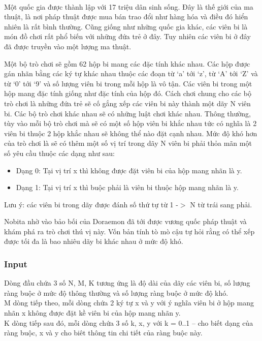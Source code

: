 

 

Một quốc gia được thành lập với 17 triệu dân sinh sống. Đây là thế giới của ma thuật, là nơi pháp thuật được mua bán trao đổi như hàng hóa và điều đó hiển nhiên là rất bình thường. Cũng giống như những quốc gia khác, các viên bi là món đồ chơi rất phổ biến với những đứa trẻ ở đây. Tuy nhiên các viên bi ở đây đã được truyền vào một lượng ma thuật.

Một bộ trò chơi sẽ gồm 62 hộp bi mang các đặc tính khác nhau. Các hộp được gán nhãn bằng các ký tự khác nhau thuộc các đoạn từ ‘a’ tới ‘z’, từ ‘A’ tới ‘Z’ và từ ‘0’ tới ‘9’ và số lượng viên bi trong mỗi hộp là vô tận. Các viên bi trong một hộp mang đặc tính giống như đặc tính của hộp đó. Cách chơi chung cho các bộ trò chơi là những đứa trẻ sẽ cố gắng xếp các viên bi này thành một dãy N viên bi. Các bộ trò chơi khác nhau sẽ có những luật chơi khác nhau. Thông thường, tùy vào mỗi bộ trò chơi mà sẽ có một số hộp viên bi khắc nhau tức có nghĩa là 2 viên bi thuộc 2 hộp khắc nhau sẽ không thể nào đặt cạnh nhau. Mức độ khó hơn của trò chơi là sẽ có thêm một số vị trí trong dãy N viên bi phải thỏa mãn một số yêu cầu thuộc các dạng như sau:
\begin{itemize}
	\item Dạng 0: Tại vị trí x thì không được đặt viên bi của hộp mang nhãn là y.
	\item Dạng 1: Tại vị trí x thì buộc phải là viên bi thuộc hộp mang nhãn là y.
\end{itemize}

Lưu ý: các viên bi trong dãy được đánh số thứ tự từ 1 -$>$ N từ trái sang phải.

Nobita nhờ vào bảo bối của Doraemon đã tới được vương quốc pháp thuật và khám phá ra trò chơi thú vị này. Vốn bản tính tò mò cậu tự hỏi rằng có thể xếp được tối đa là bao nhiêu dãy bi khác nhau ở mức độ khó.

\subsubsection{\textbf{Input }}

Dòng đầu chứa 3 số N, M, K tương ứng là độ dài của dãy các viên bi, số lượng ràng buộc ở mức độ thông thường và số lượng ràng buộc ở mức độ khó.
\\M dòng tiếp theo, mỗi dòng chứa 2 ký tự x và y với ý nghĩa viên bi ở hộp mang nhãn x không được đặt kề viên bi của hộp mang nhãn y.
\\K dòng tiếp sau đó, mỗi dòng chứa 3 số k, x, y với k = 0..1 – cho biết dạng của ràng buộc, x và y cho biêt thông tin chi tiết của ràng buộc này.

